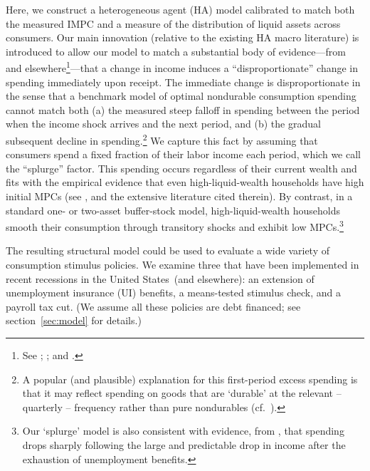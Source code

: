 \documentclass[\econtexRoot/HAFiscal]{subfiles}
\begin{document}
Here, we construct a heterogeneous agent (HA) model calibrated to match both the measured IMPC and a measure of the distribution of liquid assets across consumers.  Our main innovation (relative to the existing HA macro literature) is introduced to allow our model to match a substantial body of evidence---from \cite{fagereng_mpc_2021} and elsewhere\footnote{See \cite{parker2013consumer}; \cite{ganongConsumer2019}; and \cite{olafsson2018liquid}.}---that a change in income induces a ``disproportionate'' change in spending immediately upon receipt.  The immediate change is disproportionate in the sense that a benchmark model of optimal nondurable consumption spending cannot match both (a) the measured steep falloff in spending between the period when the income shock arrives and the next period, and (b) the gradual subsequent decline in spending.\footnote{A popular (and plausible) explanation for this first-period excess spending is that it may reflect spending on goods that are `durable' at the relevant -- quarterly -- frequency rather than pure nondurables (cf.\ \cite{laibson2022simple}).}  We capture this fact by assuming that consumers spend a fixed fraction of their labor income each period, which we call the ``splurge'' factor. This spending occurs regardless of their current wealth and fits with the empirical evidence that even high-liquid-wealth households have high initial MPCs (see \cite{crawley2023MicroMacro}, and the extensive literature cited therein).  By contrast, in a standard one- or two-asset buffer-stock model, high-liquid-wealth households smooth their consumption through transitory shocks and exhibit low MPCs.\footnote{Our `splurge' model is also consistent with evidence, from \cite{ganongConsumer2019}, that spending drops sharply following the large and predictable drop in income after the exhaustion of unemployment benefits.}

The resulting structural model could be used to evaluate a wide variety of consumption stimulus policies.  We examine three that have been implemented in recent recessions in the United States\ (and elsewhere): an extension of unemployment insurance (UI) benefits, a means-tested stimulus check, and a payroll tax cut.  (We assume all these policies are debt financed; see section~\ref{sec:model} for details.)  %
\end{document}

